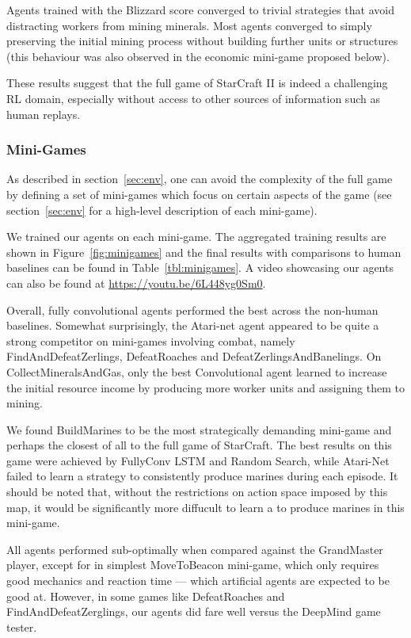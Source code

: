 Agents trained with the Blizzard score converged to trivial strategies that avoid distracting workers from mining minerals. Most agents converged to simply preserving the initial mining process without building further units or structures (this behaviour was also observed in the economic mini-game proposed below).

These results suggest that the full game of StarCraft II is indeed a challenging RL domain, especially without access to other sources of information such as human replays.

\subsubsection{Mini-Games}

As described in section~\ref{sec:env}, one can avoid the complexity of the full game by defining a set of mini-games which focus on certain aspects of the game (see section~\ref{sec:env} for a high-level description of each mini-game). 

We trained our agents on each mini-game. The aggregated training results are shown in Figure~\ref{fig:minigames} and the final results with comparisons to human baselines can be found in Table~\ref{tbl:minigames}. A video showcasing our agents can also be found at \url{https://youtu.be/6L448yg0Sm0}.

Overall, fully convolutional agents performed the best across the non-human baselines. Somewhat surprisingly, the Atari-net agent appeared to be quite a strong competitor on mini-games involving combat, namely FindAndDefeatZerlings, DefeatRoaches and DefeatZerlingsAndBanelings. On CollectMineralsAndGas, only the best Convolutional agent learned to increase the initial resource income by producing more worker units and assigning them to mining.

We found BuildMarines to be the most strategically demanding mini-game and perhaps the closest of all to the full game of StarCraft. The best results on this game were achieved by FullyConv LSTM and Random Search, while Atari-Net failed to learn a strategy to consistently produce marines during each episode. It should be noted that, without the restrictions on action space imposed by this map, it would be significantly more diffucult to learn a to produce marines in this mini-game.

All agents performed sub-optimally when compared against the GrandMaster player, except for in simplest MoveToBeacon mini-game, which only requires good mechanics and reaction time --- which artificial agents are expected to be good at. However, in some games like DefeatRoaches and FindAndDefeatZerglings, our agents did fare well versus the DeepMind game tester.

